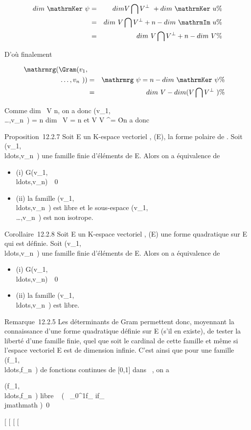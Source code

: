 \documentclass[]{article}
\begin{document}
\begin{align*} dim~
\mathrmKer~\psi& =&
dim V \bigcap V ^\bot~
+ dim~
\mathrmKer~u \%&
\\ & =& dim~ V
\bigcap V ^\bot + n - dim~
\mathrmIm~u\%&
\\ & =& dim~ V
\bigcap V ^\bot + n - dim~ V \%&
\\ \end{align*}

D'où finalement

\begin{align*}
\mathrmrg(\Gram(v_1,\\\ldots,v_n~))&
=& \mathrmrg~\psi = n
- dim~
\mathrmKer~\psi \%&
\\ & =& dim~ V
- dim (V \bigcap V ^\bot~)\%&
\\ \end{align*}

Comme dim~ V \leq n, on a donc
\mathrmrg\Gram(v_1,\\\ldots,v_n~)
= n \Leftrightarrow dim~ V = n et
V \bigcap V ^\bot = \0\. On a donc

Proposition~12.2.7 Soit E un K-espace vectoriel , \Phi \inQ(E), \phi la forme
polaire de \Phi. Soit
(v_1,\\ldots,v_n~)
une famille finie d'éléments de E. Alors on a équivalence de

\begin{itemize}
\itemsep1pt\parskip0pt
\item
  (i)
  G(v_1,\\ldots,v_n)\mathrel\neq~~0
\item
  (ii) la famille
  (v_1,\\ldots,v_n~)
  est libre et le sous-espace
  \mathrmVect(v_1,\\\ldots,v_n~)
  est non isotrope.
\end{itemize}

Corollaire~12.2.8 Soit E un K-espace vectoriel , \Phi \inQ(E) une forme
quadratique sur E qui est définie. Soit
(v_1,\\ldots,v_n~)
une famille finie d'éléments de E. Alors on a équivalence de

\begin{itemize}
\itemsep1pt\parskip0pt
\item
  (i)
  G(v_1,\\ldots,v_n)\mathrel\neq~~0
\item
  (ii) la famille
  (v_1,\\ldots,v_n~)
  est libre.
\end{itemize}

Remarque~12.2.5 Les déterminants de Gram permettent donc, moyennant la
connaissance d'une forme quadratique définie sur E (s'il en existe), de
tester la liberté d'une famille finie, quel que soit le cardinal de
cette famille et même si l'espace vectoriel E est de dimension infinie.
C'est ainsi que pour une famille
(f_1,\\ldots,f_n~)
de fonctions continues de {[}0,1{]} dans ~, on a

(f_1,\\ldots,f_n~)\text
libre  \Leftrightarrow
{}~
\left (\int ~
_0^1f_ if_\\jmathmath\right
)\neq~0

{[}
{[}
{[}
{[}
\end{document}
